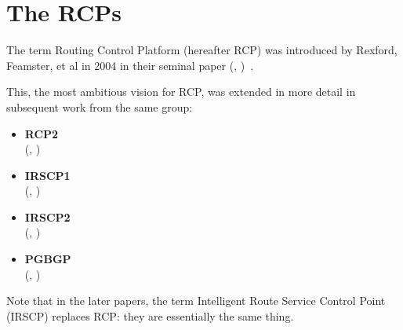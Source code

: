 \section{The RCPs}
The term Routing Control Platform (hereafter RCP) was introduced by Rexford, Feamster, et al in 2004 in their seminal paper      (\citeauthor{Feamster2004}, \citeyear{Feamster2004})~\cite{Feamster2004}.


This, the most ambitious vision for RCP, was extended in more detail in subsequent work from the same group:

\begin{itemize}
    \item \textbf{RCP2} \\(\citeauthor{Caesar2005}, \citeyear{Caesar2005})~\cite{Caesar2005}
    \item \textbf{IRSCP1} \\(\citeauthor{VanDerMerwe2006}, \citeyear{VanDerMerwe2006})~\cite{VanDerMerwe2006}
    \item \textbf{IRSCP2} \\(\citeauthor{Karlin2006}, \citeyear{Karlin2006})~\cite{Karlin2006}
    \item \textbf{PGBGP} \\(\citeauthor{Verkaik2007}, \citeyear{Verkaik2007})~\cite{Verkaik2007}
\end{itemize}


Note that in the later papers, the term Intelligent Route Service Control Point (IRSCP) replaces RCP: they are essentially the same thing.

\bigskip

